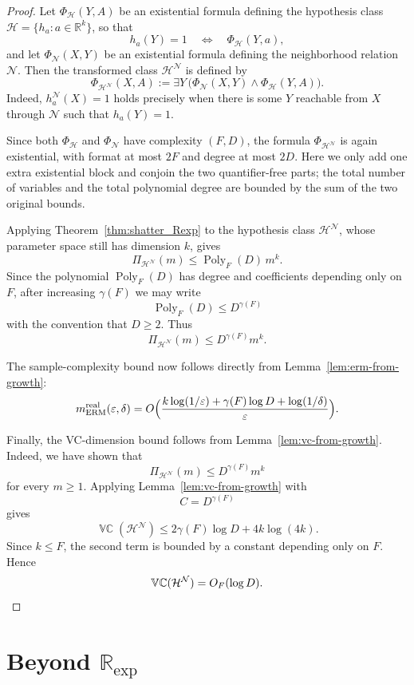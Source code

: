 \documentclass[11pt]{article}
\theoremstyle{plain}
\theoremstyle{definition}
\theoremstyle{remark}
\DeclareMathOperator{\VCdim}{\mathbb{VC}}
\newcommand{\R}{\mathbb{R}}
\newcommand{\cH}{\mathcal{H}}
\newcommand{\cN}{\mathcal{N}}
\newcommand{\Poly}{\operatorname{Poly}}
\begin{document}
\begin{proof}
Let \(\Phi_{\cH}(Y,A)\) be an existential formula defining the hypothesis class
\(\cH=\{h_a:a\in\R^k\}\), so that
\[
  h_a(Y)=1 \quad\Longleftrightarrow\quad \Phi_{\cH}(Y,a),
\]
and let \(\Phi_\cN(X,Y)\) be an existential formula defining the neighborhood relation \(\cN\). Then the transformed class \(\cH^\cN\) is defined by
\[
  \Phi_{\cH^\cN}(X,A)
  :=
  \exists Y\,
  \bigl(
    \Phi_\cN(X,Y)\wedge \Phi_{\cH}(Y,A)
  \bigr).
\]
Indeed, \(h_a^{\cN}(X)=1\) holds precisely when there is some \(Y\) reachable from \(X\) through \(\cN\) such that \(h_a(Y) = 1\).

Since both \(\Phi_{\cH}\) and \(\Phi_\cN\) have complexity \((F,D)\), the formula
\(\Phi_{\cH^\cN}\) is again existential, with format at most \(2F\) and degree at
most \(2D\). Here we only add one extra existential block and conjoin the two
quantifier-free parts; the total number of variables and the total polynomial
degree are bounded by the sum of the two original bounds.

Applying Theorem~\ref{thm:shatter_Rexp} to the hypothesis class \(\cH^\cN\), whose parameter space still has dimension \(k\), gives
\[
  \Pi_{\cH^\cN}(m)
  \le
  \Poly_F(D)\,m^k .
\]
Since the polynomial \(\Poly_F(D)\) has degree and coefficients depending only
on \(F\), after increasing \(\gamma(F)\) we may write
\[
  \Poly_F(D)\le D^{\gamma(F)}
\]
with the convention that \(D\ge 2\). Thus
\[
  \Pi_{\cH^\cN}(m)\le D^{\gamma(F)}m^k .
\]

The sample-complexity bound now follows directly from
Lemma~\ref{lem:erm-from-growth}:
\[
m_{\mathrm{ERM}}^{\mathrm{real}}(\varepsilon,\delta)
=
O\Bigl(
  \frac{
    k\log(1/\varepsilon)
    + \gamma(F)\log D
    + \log(1/\delta)
  }{\varepsilon}
\Bigr).
\]

Finally, the VC-dimension bound follows from
Lemma~\ref{lem:vc-from-growth}. Indeed, we have shown that
\[
  \Pi_{\cH^\cN}(m)\le D^{\gamma(F)}m^k
\]
for every \(m\ge 1\). Applying Lemma~\ref{lem:vc-from-growth} with
\[
  C=D^{\gamma(F)}
\]
gives
\[
  \VCdim(\cH^\cN)
  \le
  2\gamma(F)\log D + 4k\log(4k).
\]
Since \(k\le F\), the second term is bounded by a constant depending only on
\(F\). Hence
\[
  \VCdim(\cH^\cN)=O_F(\log D). \qedhere
\]
\end{proof}

\section{Beyond \texorpdfstring{$\R_{\exp}$}{Rexp}}
\label{app:beyond-Rexp}
\end{document}

